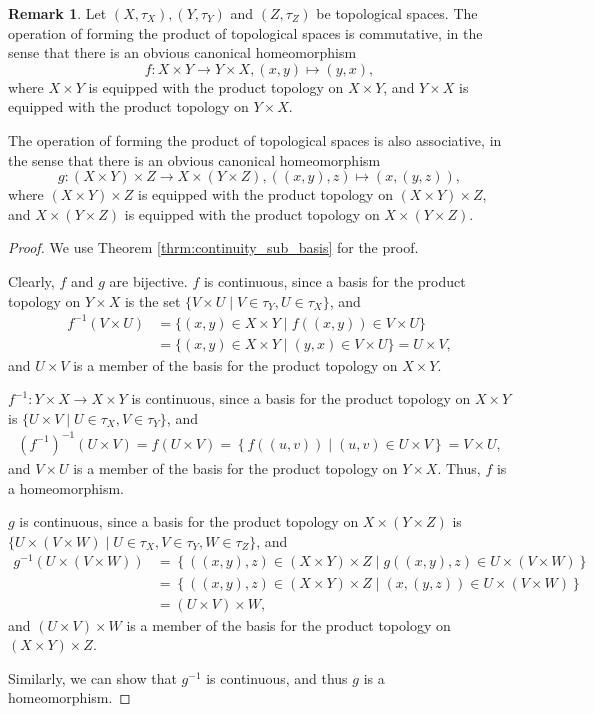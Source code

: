 \documentclass[12pt, a4paper]{article}
\numberwithin{equation}{section}
\theoremstyle{definition}
\theoremstyle{definition}
\newtheorem{remark}[thm]{Remark} %
\begin{document}
		\begin{remark}\label{remark:op_prod_top_spaces_comm_associat}
			Let $(X, \tau_X), (Y, \tau_Y)$ and $(Z, \tau_Z)$ be topological spaces. The operation of forming the product of topological spaces is commutative, in the sense that there is an obvious canonical homeomorphism $$f: X\times Y\to Y\times X, (x, y)\mapsto (y, x),$$ where $X\times Y$ is equipped with the product topology on $X\times Y$, and $Y\times X$ is equipped with the product topology on $Y\times X$. 
			
			The operation of forming the product of topological spaces is also associative, in the sense that there is an obvious canonical homeomorphism $$g: \left(X\times Y\right)\times Z\to X\times (Y\times Z), ((x, y), z)\mapsto (x, (y, z)),$$ where $(X\times Y)\times Z$ is equipped with the product topology on $(X\times Y)\times Z$, and $X\times (Y\times Z)$ is equipped with the product topology on $X\times (Y\times Z)$.
		\end{remark}
		
		\begin{proof}
			We use Theorem \ref{thrm:continuity_sub_basis} for the proof. 
			
			Clearly, $f$ and $g$ are bijective. $f$ is continuous, since a basis for the product topology on $Y\times X$ is the set $\{V\times U \mid V\in\tau_Y, U\in\tau_X \}$, and 
			\begin{align*}
				f^{-1}(V\times U) &= \{(x, y)\in X\times Y\mid f((x, y))\in V\times U\} \\ &= \{(x, y)\in X\times Y\mid (y, x)\in V\times U\} = U\times V,
			\end{align*}
			and $U\times V$ is a member of the basis for the product topology on $X\times Y$.
			
			$f^{-1}: Y\times X\to X\times Y$ is continuous, since a basis for the product topology on $X\times Y$ is $\{U\times V \mid U\in\tau_X, V\in\tau_Y \}$, and
			\begin{align*}
				\left(f^{-1}\right)^{-1}(U\times V) = f(U\times V) = \left\{f((u, v))\mid (u, v)\in U\times V\right\} = V\times U,
			\end{align*}
			and $V\times U$ is a member of the basis for the product topology on $Y\times X$.
			Thus, $f$ is a homeomorphism.
			
			$g$ is continuous, since a basis for the product topology on $X\times (Y\times Z)$ is $\{ U\times (V\times W) \mid U\in\tau_X, V\in\tau_Y, W\in\tau_Z\}$, and
			\begin{align*}
				g^{-1}(U\times (V\times W)) &= \left\{ ((x, y), z) \in (X\times Y)\times Z \mid g((x, y), z) \in U\times(V\times W) \right\}
				\\ &= \left\{ ((x, y), z) \in (X\times Y)\times Z \mid (x, (y, z)) \in U\times(V\times W) \right\}
				\\ &= (U\times V)\times W,
			\end{align*}
			and $(U\times V)\times W$ is a member of the basis for the product topology on $(X\times Y)\times Z$.
			
			Similarly, we can show that $g^{-1}$ is continuous, and thus $g$ is a homeomorphism.
		\end{proof}
		
\end{document}
